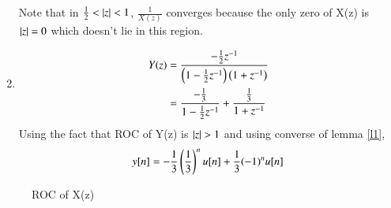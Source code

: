 \documentclass[journal,12pt,twocolumn]{IEEEtran}
\begin{document}
\begin{enumerate}[label=(\alph*)]
Note that in $\frac{1}{2} < \vert z\vert < 1$, $\frac{1}{X(z)}$ converges because the only zero of X(z) is $\vert z\vert = 0$ which doesn't lie in this region.
\item 
\begin{align}
    Y(z) &= \dfrac{-\frac{1}{2}z^{-1}}{\left(1-\frac{1}{2}z^{-1}\right)\left(1+z^{-1}\right)}\\
         &= \dfrac{-\frac{1}{3}}{1-\frac{1}{2}z^{-1}} + \dfrac{\frac{1}{3}}{1+z^{-1}}
\end{align}
Using the fact that ROC of Y(z) is $\vert z\vert > 1$ and using converse of lemma \ref{l1}, \begin{equation}
    y[n] = -\dfrac{1}{3}\left(\dfrac{1}{3}\right)^nu[n] + \dfrac{
    1}{3}(-1)^nu[n]
\end{equation} 
\end{enumerate}

\begin{figure}[h]
    \centering
    \caption{ROC of X(z)}
\end{figure}
\end{document}
